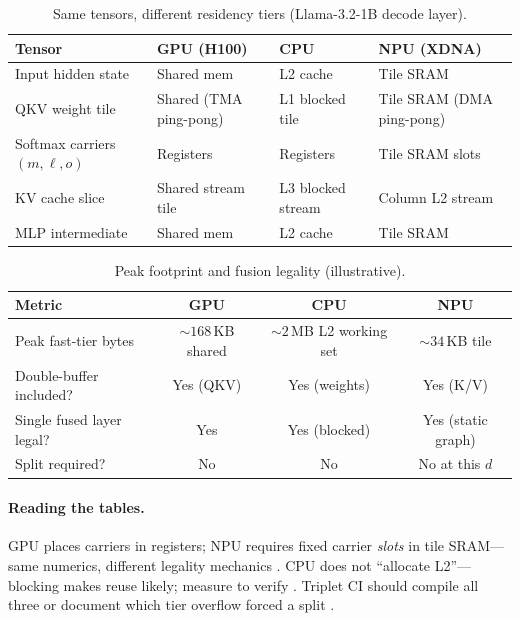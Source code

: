 \begin{table}[t]
\centering
\small
\caption{Same tensors, different residency tiers (Llama-3.2-1B decode layer).}
\label{tab:ch06_tri_hw_allocation}
\begin{tabular}{@{}llll@{}}
\toprule
\textbf{Tensor} & \textbf{GPU (H100)} & \textbf{CPU} & \textbf{NPU (XDNA)} \\
\midrule
Input hidden state & Shared mem & L2 cache & Tile SRAM \\
QKV weight tile & Shared (TMA ping-pong) & L1 blocked tile & Tile SRAM (DMA ping-pong) \\
Softmax carriers $(m,\ell,o)$ & Registers & Registers & Tile SRAM slots \\
KV cache slice & Shared stream tile & L3 blocked stream & Column L2 stream \\
MLP intermediate & Shared mem & L2 cache & Tile SRAM \\
\bottomrule
\end{tabular}
\end{table}

\begin{table}[t]
\centering
\small
\caption{Peak footprint and fusion legality (illustrative).}
\label{tab:ch06_peak_footprint}
\begin{tabular}{@{}lccc@{}}
\toprule
\textbf{Metric} & \textbf{GPU} & \textbf{CPU} & \textbf{NPU} \\
\midrule
Peak fast-tier bytes & ${\sim}168$\,KB shared & ${\sim}2$\,MB L2 working set & ${\sim}34$\,KB tile \\
Double-buffer included? & Yes (QKV) & Yes (weights) & Yes (K/V) \\
Single fused layer legal? & Yes & Yes (blocked) & Yes (static graph) \\
Split required? & No & No & No at this $d$ \\
\bottomrule
\end{tabular}
\end{table}

\paragraph{Reading the tables.}
GPU places carriers in registers; NPU requires fixed carrier \emph{slots} in tile SRAM---same numerics, different legality mechanics \citep{dao2022flashattention,amd2024aie,nvidia2022hopper}.
CPU does not ``allocate L2''---blocking makes reuse likely; measure to verify \citep{dlbook,patel2025llminference}.
Triplet CI should compile all three or document which tier overflow forced a split \citep{yirage2026,chen2020compilerbasedhardw}.

